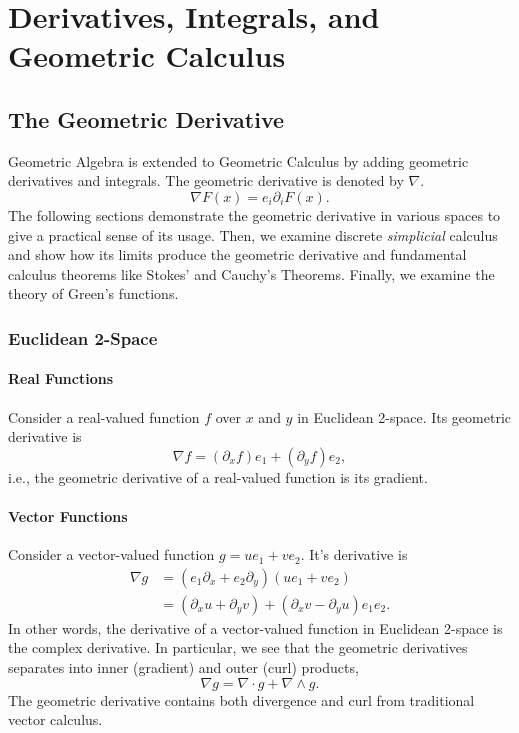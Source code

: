 \chapter{Derivatives, Integrals, and Geometric Calculus}

	\section{The Geometric Derivative}
	
	Geometric Algebra is extended to Geometric Calculus by adding geometric derivatives and integrals. The geometric derivative is denoted by $\nabla$.	
	\[
	\nabla F\left( x\right)  = e_i\partial_i F \left( x\right).
	\]	
	The following sections demonstrate the geometric derivative in various spaces to give a practical sense of its usage. Then, we examine discrete \emph{simplicial} calculus and show how its limits produce the geometric derivative and fundamental calculus theorems like Stokes' and Cauchy's Theorems. Finally, we examine the theory of Green's functions. 
	
	\subsection{Euclidean 2-Space}
	
	\subsubsection{Real Functions}
	
	Consider a real-valued function $f$ over $x$ and $y$ in Euclidean 2-space. Its geometric derivative is	
	\[
	\nabla f = \left( \partial_x f\right) e_1  + \left( \partial_y f\right) e_2,
	\]	
	i.e., the geometric derivative of a real-valued function is its gradient.
	
	\subsubsection{Vector Functions}
	
	Consider a vector-valued function $g = u e_1 + ve_2.$ It's derivative is
	\begin{align*}
	\nabla g & = \left(e_1\partial_x + e_2\partial_y \right) \left(ue_1 + ve_2 \right) \\
	 & = \left( \partial_x u + \partial_y v\right) + \left( \partial_x v - \partial_y u\right)e_1e_2. 
	\end{align*}	
	In other words, the derivative of a vector-valued function in Euclidean 2-space is the complex derivative. In particular, we see that the geometric derivatives separates into inner (gradient) and outer (curl) products,
	\[
	\nabla g = \nabla \cdot g + \nabla \wedge g.
	\]
	The geometric derivative contains both divergence and curl from traditional vector calculus.
	
